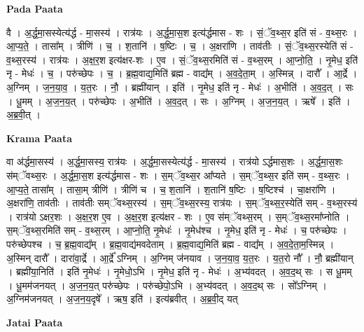 \documentclass[17pt]{extarticle}
\begin{document}
\textbf{Pada Paata} \newline

वै । अ॒र्द्ध॒मा॒सस्येत्य॑र्द्ध - मा॒सस्य॑ । रात्र॑यः । अ॒र्द्ध॒मा॒स॒श इत्य॑र्द्धमास - शः । सं॒ॅव॒थ्स॒र इति॑ सं - व॒थ्स॒रः । आ॒प्य॒ते॒ । तासा᳚म् । त्रीणि॑ । च॒ । श॒तानि॑ । ष॒ष्टिः । च॒ । अ॒क्षरा॑णि । ताव॑तीः । सं॒ॅव॒थ्स॒रस्येति॑ सं - व॒थ्स॒रस्य॑ । रात्र॑यः । अ॒क्ष॒र॒श इत्य॑क्षर-शः । ए॒व । सं॒ॅव॒थ्स॒रमिति॑ सं - व॒थ्स॒रम् । आ॒प्नो॒ति॒ । नृ॒मेध॒ इति॑ नृ - मेधः॑ । च॒ । परु॑च्छेपः । च॒ । ब्र॒ह्म॒वाद्य॒मिति॑ ब्रह्म - वाद्य᳚म् । अ॒व॒दे॒ता॒म् । अ॒स्मिन्न् । दारौ᳚ । आ॒र्द्रे । अ॒ग्निम् । ज॒न॒या॒व॒ । य॒त॒रः । नौ॒ । ब्रह्मी॑यान् । इति॑ । नृ॒मेध॒ इति॑ नृ - मेधः॑ । अ॒भीति॑ । अ॒व॒द॒त् । सः । धू॒मम् । अ॒ज॒न॒य॒त् । परु॑च्छेपः । अ॒भीति॑ । अ॒व॒द॒त् । सः । अ॒ग्निम् । अ॒ज॒न॒य॒त् । ऋषे᳚ । इति॑ । अ॒ब्र॒वी॒त् ।  \newline


\textbf{Krama Paata} \newline

वा अ॑र्द्धमा॒सस्य॑ । अ॒र्द्ध॒मा॒सस्य॒ रात्र॑यः । अ॒र्द्ध॒मा॒सस्येत्य॑र्द्ध - मा॒सस्य॑ । रात्र॑यो ऽर्द्धमास॒शः । अ॒र्द्ध॒मा॒स॒शः स॑म्ॅवथ्स॒रः । अ॒र्द्ध॒मा॒स॒श इत्य॑र्द्धमास - शः । स॒म्ॅव॒थ्स॒र आ᳚प्यते । स॒म्ॅव॒थ्स॒र इति॑ सम् - व॒थ्स॒रः । आ॒प्य॒ते॒ तासा᳚म् । तासा॒म् त्रीणि॑ । त्रीणि॑ च । च॒ श॒तानि॑ । श॒तानि॑ ष॒ष्टिः । ष॒ष्टिश्च॑ । चा॒क्षरा॑णि । अ॒क्षरा॑णि॒ ताव॑तीः । ताव॑तीः सम्ॅवथ्स॒रस्य॑ । स॒म्ॅव॒थ्स॒रस्य॒ रात्र॑यः । स॒म्ॅव॒थ्स॒र॒स्येति॑ सम् - व॒थ्स॒रस्य॑ । रात्र॑यो ऽक्षर॒शः । अ॒क्ष॒र॒श ए॒व । अ॒क्ष॒र॒श इत्य॑क्षर - शः । ए॒व स॑म्ॅवथ्स॒रम् । स॒म्ॅव॒थ्स॒रमा᳚प्नोति । स॒म्ॅव॒थ्स॒रमिति॑ सम् - व॒थ्स॒रम् । आ॒प्नो॒ति॒ नृ॒मेधः॑ । नृ॒मेध॑श्च । नृ॒मेध॒ इति॑ नृ - मेधः॑ । च॒ परु॑च्छेपः । परु॑च्छेपश्च । च॒ ब्र॒ह्म॒वाद्य᳚म् । ब्र॒ह्म॒वाद्य॑मवदेताम् । ब्र॒ह्म॒वाद्य॒मिति॑ ब्रह्म - वाद्य᳚म् । अ॒व॒दे॒ता॒म॒स्मिन्न् । अ॒स्मिन् दारौ᳚ । दारा॑वा॒र्द्रे । आ॒र्द्रे᳚ ऽग्निम् । अ॒ग्निम् ज॑नयाव । ज॒न॒या॒व॒ य॒त॒रः । य॒त॒रो नौ᳚ । नौ॒ ब्रह्मी॑यान् । ब्रह्मी॑या॒निति॑ । इति॑ नृ॒मेधः॑ । नृ॒मेधो॒ऽभि । नृ॒मेध॒ इति॑ नृ - मेधः॑ । अ॒भ्य॑वदत् । अ॒व॒द॒थ् सः । स धू॒मम् । धू॒मम॑जनयत् । अ॒ज॒न॒य॒त् परु॑च्छेपः । परु॑च्छेपो॒ऽभि । अ॒भ्य॑वदत् । अ॒व॒द॒थ् सः । सो᳚ऽग्निम् । अ॒ग्निम॑जनयत् । अ॒ज॒न॒य॒दृषे᳚ । ऋष॒ इति॑ । इत्य॑ब्रवीत् । अ॒ब्र॒वी॒द् यत् \newline

\textbf{Jatai Paata} \newline
\end{document}
